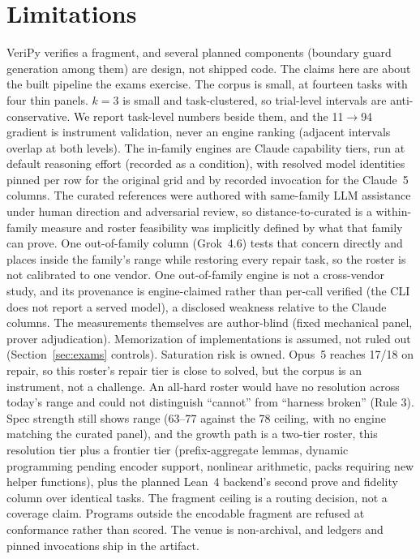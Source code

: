 \documentclass{article}
\newcommand{\toolname}{VeriPy}
\newcommand{\egrok}{Grok~4.6}
\begin{document}
\section{Limitations}
\label{sec:limits}

\toolname{} verifies a fragment, and several planned components (boundary
guard generation among them) are design, not shipped code. The claims
here are about the built pipeline the exams exercise. The corpus is
small, at fourteen tasks with four thin panels. $k{=}3$ is small and
task-clustered, so trial-level intervals are anti-conservative. We report
task-level numbers beside them, and the 11$\to$94 gradient is instrument
validation, never an engine ranking (adjacent intervals overlap at both
levels). The in-family engines are Claude capability tiers, run at
default reasoning effort (recorded as a condition), with resolved model
identities pinned per row for the original grid and by recorded
invocation for the Claude~5 columns. The curated
references were authored with same-family LLM assistance under human
direction and adversarial review, so distance-to-curated is a
within-family measure and roster feasibility was implicitly defined by
what that family can prove. One out-of-family column (\egrok{}) tests
that concern directly and places inside the family's range while
restoring every repair task, so the roster is not calibrated to one
vendor. One out-of-family engine is not a cross-vendor study, and its
provenance is engine-claimed rather than per-call verified (the CLI does
not report a served model), a disclosed weakness relative to the Claude
columns. The measurements themselves are author-blind (fixed mechanical
panel, prover adjudication). Memorization of implementations is assumed, not
ruled out (Section~\ref{sec:exams} controls). Saturation risk is owned.
Opus~5 reaches 17/18 on repair, so this roster's repair tier is close to
solved, but the corpus is an instrument, not a challenge. An all-hard
roster would have no resolution across today's range and could not
distinguish ``cannot'' from ``harness broken'' (Rule 3). Spec strength
still shows range (63--77 against the 78 ceiling, with no engine
matching the curated panel), and the growth path is a two-tier roster,
this
resolution tier plus a frontier tier (prefix-aggregate lemmas, dynamic
programming pending encoder support, nonlinear arithmetic, packs
requiring new helper functions), plus the planned Lean~4 backend's second
prove and fidelity column over identical tasks. The fragment ceiling is a routing
decision, not a coverage claim. Programs outside the encodable fragment
are refused at conformance rather than scored. The venue is non-archival,
and ledgers and pinned invocations ship in the artifact.
\end{document}
